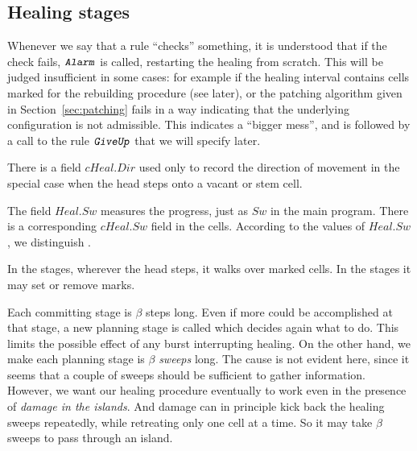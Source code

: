 \documentclass[12pt]{memoir}
\newcommand{\fld}[1]{\ensuremath{\textit{#1}}}
\newcommand{\rul}[1]{\ensuremath{\texttt{\slshape #1\/}}}
\newcommand{\Dir}{\fld{Dir}}
\newcommand{\Heal}{\fld{Heal}}
\newcommand{\cHeal}{\fld{cHeal}}
\newcommand{\Stage}{\fld{Stage}}
\newcommand{\Sweep}{\fld{Sw}}
\newcommand{\Committing}{\mathrm{Committing}}
\newcommand{\Planning}{\mathrm{Planing}}
\newcommand{\Alarm}{\rul{Alarm}}
\newcommand{\GiveUp}{\rul{GiveUp}}
\begin{document}
\subsection{Healing stages}\label{sec:rec-stages}

Whenever we say that a rule ``checks'' something,
it is understood that if the check fails, \( \Alarm \) is called, restarting the 
healing from scratch.
This will be judged insufficient in some cases: for example if 
the healing interval contains cells marked for the rebuilding procedure (see later),
or the patching algorithm given in Section~\ref{sec:patching} fails in a way
indicating that the underlying configuration is not admissible.
This indicates a ``bigger mess'', and is followed by a call to
the rule \( \GiveUp \) that we will specify later.

There is a field \( \cHeal.\Dir \) used only to record the direction
of movement in the special case when the head steps onto a vacant or stem cell.

The field \( \Heal.\Sweep \) 
measures the progress, just as \( \Sweep \) in the main program.
There is a corresponding \( \cHeal.\Sweep \) field in the cells.
According to the values of \( \Heal.\Sweep \), we distinguish .

In the  stages, wherever the head steps, it walks over marked cells.
In the  stages it may set or remove marks.

Each committing stage is \( \beta \) steps long.
Even if more could be accomplished at that stage, a new planning stage
is called which decides again what to do.
This limits the possible effect of any burst interrupting healing.
On the other hand, we make 
each planning stage is \( \beta \) \emph{sweeps} long.
The cause is not evident here, since it seems  that a couple of sweeps should
be sufficient to gather information.
However, we want our healing procedure eventually to work even
in the presence of \emph{damage in the islands}.
And damage can in principle kick back the healing sweeps repeatedly, 
while retreating only one cell at a time.
So it may take \( \beta \) sweeps to pass through an island.
\end{document}

